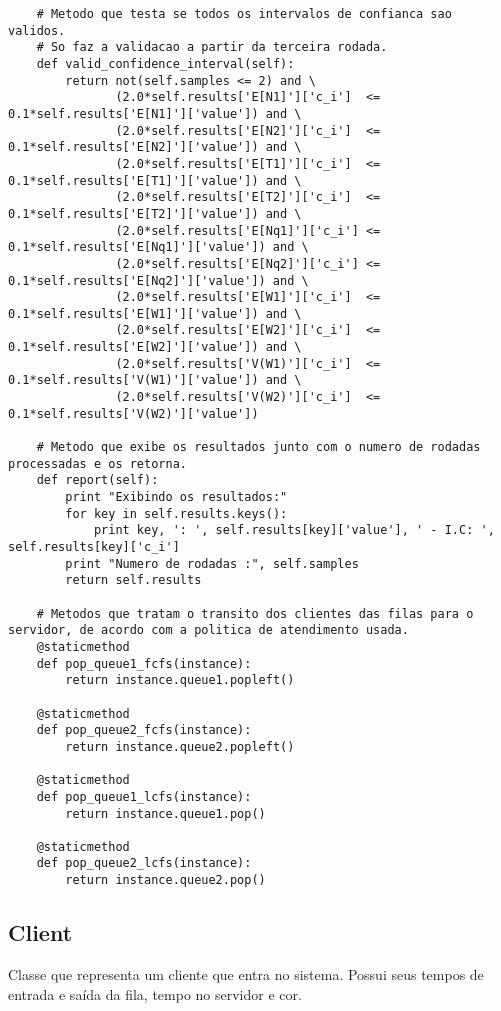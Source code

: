 \begin{lstlisting}
    # Metodo que testa se todos os intervalos de confianca sao validos.
    # So faz a validacao a partir da terceira rodada.
    def valid_confidence_interval(self):
        return not(self.samples <= 2) and \
               (2.0*self.results['E[N1]']['c_i']  <= 0.1*self.results['E[N1]']['value']) and \
               (2.0*self.results['E[N2]']['c_i']  <= 0.1*self.results['E[N2]']['value']) and \
               (2.0*self.results['E[T1]']['c_i']  <= 0.1*self.results['E[T1]']['value']) and \
               (2.0*self.results['E[T2]']['c_i']  <= 0.1*self.results['E[T2]']['value']) and \
               (2.0*self.results['E[Nq1]']['c_i'] <= 0.1*self.results['E[Nq1]']['value']) and \
               (2.0*self.results['E[Nq2]']['c_i'] <= 0.1*self.results['E[Nq2]']['value']) and \
               (2.0*self.results['E[W1]']['c_i']  <= 0.1*self.results['E[W1]']['value']) and \
               (2.0*self.results['E[W2]']['c_i']  <= 0.1*self.results['E[W2]']['value']) and \
               (2.0*self.results['V(W1)']['c_i']  <= 0.1*self.results['V(W1)']['value']) and \
               (2.0*self.results['V(W2)']['c_i']  <= 0.1*self.results['V(W2)']['value'])

    # Metodo que exibe os resultados junto com o numero de rodadas processadas e os retorna.
    def report(self):
        print "Exibindo os resultados:"
        for key in self.results.keys():
            print key, ': ', self.results[key]['value'], ' - I.C: ', self.results[key]['c_i']
        print "Numero de rodadas :", self.samples
        return self.results
    
    # Metodos que tratam o transito dos clientes das filas para o servidor, de acordo com a politica de atendimento usada.
    @staticmethod
    def pop_queue1_fcfs(instance):
        return instance.queue1.popleft()
        
    @staticmethod
    def pop_queue2_fcfs(instance):
        return instance.queue2.popleft()
        
    @staticmethod
    def pop_queue1_lcfs(instance):
        return instance.queue1.pop()
        
    @staticmethod
    def pop_queue2_lcfs(instance):
        return instance.queue2.pop()
\end{lstlisting}

\subsection{Client}
Classe que representa um cliente que entra no sistema. Possui seus tempos de entrada e saída da fila, tempo no servidor e cor.\\

